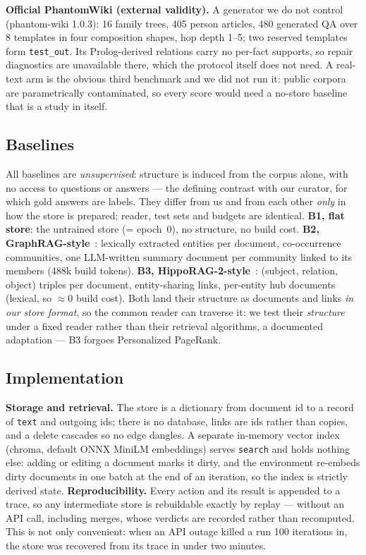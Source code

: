 \documentclass[conference]{IEEEtran}
\begin{document}
\textbf{Official PhantomWiki (external validity).} A generator we do not
control (phantom-wiki 1.0.3): 16 family trees, 405 person articles, 480
generated QA over 8 templates in four composition shapes, hop depth 1--5;
two reserved templates form \texttt{test\_out}. Its Prolog-derived relations
carry no per-fact supports, so repair diagnostics are unavailable there,
which the protocol itself does not need. A real-text arm is the obvious
third benchmark and we did not run it: public corpora are parametrically
contaminated, so every score would need a no-store baseline that is a study
in itself.

\subsection{Baselines}
All baselines are \emph{unsupervised}: structure is induced from the corpus
alone, with no access to questions or answers --- the defining contrast with
our curator, for which gold answers are labels. They differ from us and from
each other \emph{only} in how the store is prepared; reader, test sets and
budgets are identical. \textbf{B1, flat store}: the untrained store
(= epoch~0), no structure, no build cost. \textbf{B2,
GraphRAG-style}~\cite{graphrag}: lexically extracted entities per document,
co-occurrence communities, one LLM-written summary document per community
linked to its members (488k build tokens). \textbf{B3,
HippoRAG-2-style}~\cite{hipporag2}: (subject, relation, object) triples per
document, entity-sharing links, per-entity hub documents (lexical, so
$\approx$0 build cost). Both land their structure as documents and links
\emph{in our store format}, so the common reader can traverse it: we test
their \emph{structure} under a fixed reader rather than their retrieval
algorithms, a documented adaptation --- B3 forgoes Personalized PageRank.

\subsection{Implementation}
\textbf{Storage and retrieval.} The store is a dictionary from document id
to a record of \texttt{text} and outgoing ids; there is no database, links
are ids rather than copies, and a delete cascades so no edge dangles. A
separate in-memory vector index (chroma, default ONNX MiniLM embeddings)
serves \texttt{search} and holds nothing else: adding or editing a document
marks it dirty, and the environment re-embeds dirty documents in one batch at
the end of an iteration, so the index is strictly derived state.
\textbf{Reproducibility.} Every action and its result is appended to a
trace, so any intermediate store is rebuildable exactly by replay --- without
an API call, including merges, whose verdicts are recorded rather than
recomputed. This is not only convenient: when an API outage killed a run 100
iterations in, the store was recovered from its trace in under two minutes.
\end{document}
